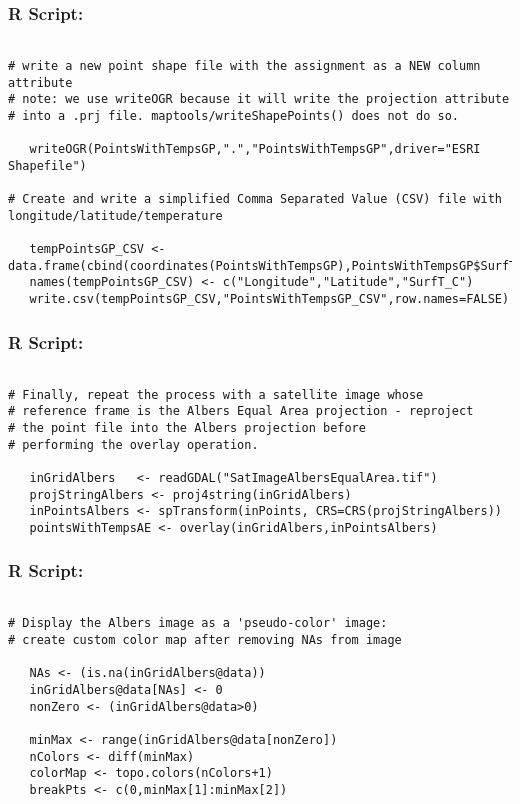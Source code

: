 \documentclass{beamer}
\begin{document}
\begin{frame}[fragile]
\frametitle{R Script:}
\begin{framed}
\begin{verbatim}

# write a new point shape file with the assignment as a NEW column attribute
# note: we use writeOGR because it will write the projection attribute
# into a .prj file. maptools/writeShapePoints() does not do so.

   writeOGR(PointsWithTempsGP,".","PointsWithTempsGP",driver="ESRI Shapefile")

# Create and write a simplified Comma Separated Value (CSV) file with longitude/latitude/temperature

   tempPointsGP_CSV <- data.frame(cbind(coordinates(PointsWithTempsGP),PointsWithTempsGP$SurfTemp))
   names(tempPointsGP_CSV) <- c("Longitude","Latitude","SurfT_C")
   write.csv(tempPointsGP_CSV,"PointsWithTempsGP_CSV",row.names=FALSE)
\end{verbatim}
\end{framed}
\end{frame}
\begin{frame}[fragile]
\frametitle{R Script:}
\begin{framed}
\begin{verbatim}

# Finally, repeat the process with a satellite image whose
# reference frame is the Albers Equal Area projection - reproject
# the point file into the Albers projection before
# performing the overlay operation.
    
   inGridAlbers   <- readGDAL("SatImageAlbersEqualArea.tif")   
   projStringAlbers <- proj4string(inGridAlbers)
   inPointsAlbers <- spTransform(inPoints, CRS=CRS(projStringAlbers))
   pointsWithTempsAE <- overlay(inGridAlbers,inPointsAlbers)
\end{verbatim}
\end{framed}
\end{frame}
\begin{frame}[fragile]
\frametitle{R Script:}
\begin{framed}
\begin{verbatim}

# Display the Albers image as a 'pseudo-color' image:
# create custom color map after removing NAs from image

   NAs <- (is.na(inGridAlbers@data)) 
   inGridAlbers@data[NAs] <- 0      
   nonZero <- (inGridAlbers@data>0)
   
   minMax <- range(inGridAlbers@data[nonZero])  
   nColors <- diff(minMax)
   colorMap <- topo.colors(nColors+1)
   breakPts <- c(0,minMax[1]:minMax[2])
\end{verbatim}
\end{framed}
\end{frame}
\end{document}
